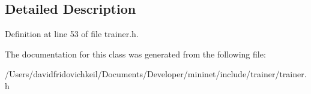 \subsection{Detailed Description}


Definition at line 53 of file trainer.\+h.



The documentation for this class was generated from the following file\+:\begin{DoxyCompactItemize}
\item 
/\+Users/davidfridovichkeil/\+Documents/\+Developer/mininet/include/trainer/trainer.\+h\end{DoxyCompactItemize}
